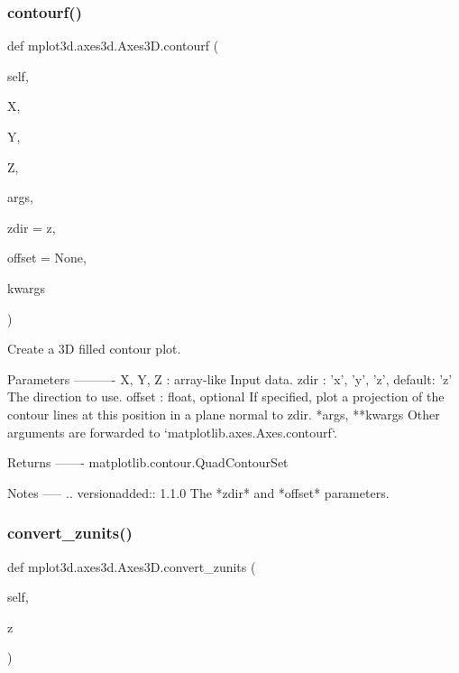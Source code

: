 \subsubsection{\texorpdfstring{contourf()}{contourf()}}
{\footnotesize\ttfamily def mplot3d.\+axes3d.\+Axes3\+D.\+contourf (\begin{DoxyParamCaption}\item[{}]{self,  }\item[{}]{X,  }\item[{}]{Y,  }\item[{}]{Z,  }\item[{}]{args,  }\item[{}]{zdir = {\ttfamily \textquotesingle{}z\textquotesingle{}},  }\item[{}]{offset = {\ttfamily None},  }\item[{}]{kwargs }\end{DoxyParamCaption})}

\begin{DoxyVerb}Create a 3D filled contour plot.

Parameters
----------
X, Y, Z : array-like
    Input data.
zdir : {'x', 'y', 'z'}, default: 'z'
    The direction to use.
offset : float, optional
    If specified, plot a projection of the contour lines at this
    position in a plane normal to zdir.
*args, **kwargs
    Other arguments are forwarded to `matplotlib.axes.Axes.contourf`.

Returns
-------
matplotlib.contour.QuadContourSet

Notes
-----
.. versionadded:: 1.1.0
    The *zdir* and *offset* parameters.
\end{DoxyVerb}
 \mbox{\label{classmplot3d_1_1axes3d_1_1Axes3D_abed013a980faf0473d375c5239a2487d}} 
\subsubsection{\texorpdfstring{convert\+\_\+zunits()}{convert\_zunits()}}
{\footnotesize\ttfamily def mplot3d.\+axes3d.\+Axes3\+D.\+convert\+\_\+zunits (\begin{DoxyParamCaption}\item[{}]{self,  }\item[{}]{z }\end{DoxyParamCaption})}


